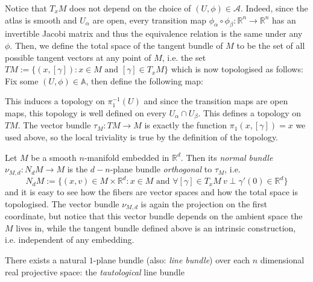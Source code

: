 \begin{examples}
\begin{i_enum}
Notice that $T_xM$ does not depend on the choice of $(U,\phi)\in\mathcal{A}$. Indeed, since the atlas is smooth and $U_{\alpha}$ are open, every transition map $\phi_{\alpha}\circ\phi_{\beta}:\mathbb{R}^n\to\mathbb{R}^n$ has an invertible Jacobi matrix and thus the equivalence relation is the same under any $\phi$. Then, we define the total space of the tangent bundle of $M$ to be the set of all possible tangent vectors at any point of $M$, i.e. the set
$TM:=\big\{(x,[\gamma]):x\in M\text{ and }[\gamma]\in T_xM\big\}$
which is now topologised as follows: Fix some $(U,\phi)\in\mathbb{A}$, then define the following map:
\begin{center}
\end{center}
This induces a topology on $\pi_1^{-1}(U)$ and since the transition maps are open maps, this topology is well defined on every $U_{\alpha}\cap U_{\beta}$. This defines a topology on $TM$. The vector bundle $\tau_{M}:TM\to M$ is exactly the function $\pi_1(x,[\gamma])=x$ we used above, so the local triviality is true by the definition of the topology.
\item Let $M$ be a smooth $n$-manifold embedded in $\mathbb{R}^d$. Then its \emph{normal bundle} $\nu_{M,d}:N_dM\to M$ is the $d-n$-plane bundle \emph{orthogonal} to $\tau_M$, i.e.
\[N_dM:=\big\{(x,v)\in M\times\mathbb{R}^d:x\in M\text{ and }\forall[\gamma]\in T_xM\ v\perp\gamma'(0)\in\mathbb{R}^d\big\}\]
and it is easy to see how the fibers are vector spaces and how the total space is topologised. The vector bundle $\nu_{M,d}$ is again the projection on the first coordinate, but notice that this vector bundle depends on the ambient space the $M$ lives in, while the tangent bundle defined above is an intrinsic construction, i.e. independent of any embedding.
\item\label{ex:tautological_line_bundle} There exists a natural $1$-plane bundle (also: \emph{line bundle}) over each $n$ dimensional real projective space: the \emph{tautological} line bundle
\begin{center}

\end{center}
\end{i_enum}
\end{examples}
